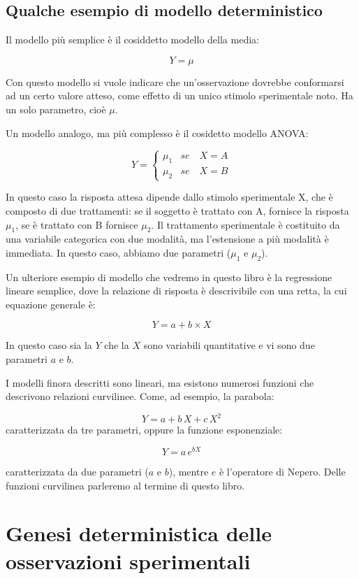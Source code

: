 \documentclass[a4paper,12pt,oneside]{book}
\begin{document}
\hypertarget{qualche-esempio-di-modello-deterministico}{%
\subsection{Qualche esempio di modello deterministico}\label{qualche-esempio-di-modello-deterministico}}

Il modello più semplice è il cosiddetto modello della media:

\[ Y = \mu \]

Con questo modello si vuole indicare che un'osservazione dovrebbe conformarsi ad un certo valore atteso, come effetto di un unico stimolo sperimentale noto. Ha un solo parametro, cioè \(\mu\).

Un modello analogo, ma più complesso è il cosidetto modello ANOVA:

\[
Y = \left\{ {\begin{array}{ll}
\mu_1 & se \quad X = A \\
\mu_2 & se \quad X = B
\end{array}} \right.
\]

In questo caso la risposta attesa dipende dallo stimolo sperimentale X, che è composto di due trattamenti: se il soggetto è trattato con A, fornisce la risposta \(\mu_1\), se è trattato con B fornisce \(\mu_2\). Il trattamento sperimentale è costituito da una variabile categorica con due modalità, ma l'estensione a più modalità è immediata. In questo caso, abbiamo due parametri (\(\mu_1\) e \(\mu_2\)).

Un ulteriore esempio di modello che vedremo in questo libro è la regressione lineare semplice, dove la relazione di risposta è descrivibile con una retta, la cui equazione generale è:

\[ Y = a + b \times X \]

In questo caso sia la \(Y\) che la \(X\) sono variabili quantitative e vi sono due parametri \(a\) e \(b\).

I modelli finora descritti sono lineari, ma esistono numerosi funzioni che descrivono relazioni curvilinee. Come, ad esempio, la parabola:

\[ Y = a + b \, X + c \, X^2\]
caratterizzata da tre parametri, oppure la funzione esponenziale:

\[ Y = a \, e^{b X} \]

caratterizzata da due parametri (\(a\) e \(b\)), mentre \(e\) è l'operatore di Nepero. Delle funzioni curvilinea parleremo al termine di questo libro.

\hypertarget{genesi-deterministica-delle-osservazioni-sperimentali}{%
\section{Genesi deterministica delle osservazioni sperimentali}\label{genesi-deterministica-delle-osservazioni-sperimentali}}
\end{document}
